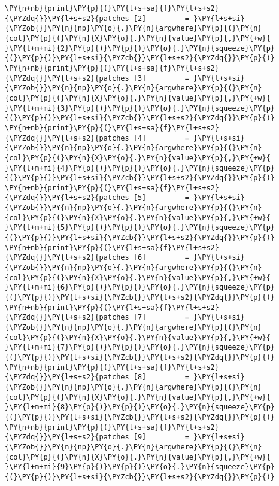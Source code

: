 \begin{tcolorbox}[breakable, size=fbox, boxrule=1pt, pad at break*=1mm,colback=cellbackground, colframe=cellborder]
\begin{Verbatim}[commandchars=\\\{\}]
\PY{n+nb}{print}\PY{p}{(}\PY{l+s+sa}{f}\PY{l+s+s2}{\PYZdq{}}\PY{l+s+s2}{patches [2]         = }\PY{l+s+si}{\PYZob{}}\PY{n}{np}\PY{o}{.}\PY{n}{argwhere}\PY{p}{(}\PY{n}{col}\PY{p}{(}\PY{n}{X}\PY{o}{.}\PY{n}{value}\PY{p}{,}\PY{+w}{ }\PY{l+m+mi}{2}\PY{p}{)}\PY{p}{)}\PY{o}{.}\PY{n}{squeeze}\PY{p}{(}\PY{p}{)}\PY{l+s+si}{\PYZcb{}}\PY{l+s+s2}{\PYZdq{}}\PY{p}{)}
\PY{n+nb}{print}\PY{p}{(}\PY{l+s+sa}{f}\PY{l+s+s2}{\PYZdq{}}\PY{l+s+s2}{patches [3]         = }\PY{l+s+si}{\PYZob{}}\PY{n}{np}\PY{o}{.}\PY{n}{argwhere}\PY{p}{(}\PY{n}{col}\PY{p}{(}\PY{n}{X}\PY{o}{.}\PY{n}{value}\PY{p}{,}\PY{+w}{ }\PY{l+m+mi}{3}\PY{p}{)}\PY{p}{)}\PY{o}{.}\PY{n}{squeeze}\PY{p}{(}\PY{p}{)}\PY{l+s+si}{\PYZcb{}}\PY{l+s+s2}{\PYZdq{}}\PY{p}{)}
\PY{n+nb}{print}\PY{p}{(}\PY{l+s+sa}{f}\PY{l+s+s2}{\PYZdq{}}\PY{l+s+s2}{patches [4]         = }\PY{l+s+si}{\PYZob{}}\PY{n}{np}\PY{o}{.}\PY{n}{argwhere}\PY{p}{(}\PY{n}{col}\PY{p}{(}\PY{n}{X}\PY{o}{.}\PY{n}{value}\PY{p}{,}\PY{+w}{ }\PY{l+m+mi}{4}\PY{p}{)}\PY{p}{)}\PY{o}{.}\PY{n}{squeeze}\PY{p}{(}\PY{p}{)}\PY{l+s+si}{\PYZcb{}}\PY{l+s+s2}{\PYZdq{}}\PY{p}{)}
\PY{n+nb}{print}\PY{p}{(}\PY{l+s+sa}{f}\PY{l+s+s2}{\PYZdq{}}\PY{l+s+s2}{patches [5]         = }\PY{l+s+si}{\PYZob{}}\PY{n}{np}\PY{o}{.}\PY{n}{argwhere}\PY{p}{(}\PY{n}{col}\PY{p}{(}\PY{n}{X}\PY{o}{.}\PY{n}{value}\PY{p}{,}\PY{+w}{ }\PY{l+m+mi}{5}\PY{p}{)}\PY{p}{)}\PY{o}{.}\PY{n}{squeeze}\PY{p}{(}\PY{p}{)}\PY{l+s+si}{\PYZcb{}}\PY{l+s+s2}{\PYZdq{}}\PY{p}{)}
\PY{n+nb}{print}\PY{p}{(}\PY{l+s+sa}{f}\PY{l+s+s2}{\PYZdq{}}\PY{l+s+s2}{patches [6]         = }\PY{l+s+si}{\PYZob{}}\PY{n}{np}\PY{o}{.}\PY{n}{argwhere}\PY{p}{(}\PY{n}{col}\PY{p}{(}\PY{n}{X}\PY{o}{.}\PY{n}{value}\PY{p}{,}\PY{+w}{ }\PY{l+m+mi}{6}\PY{p}{)}\PY{p}{)}\PY{o}{.}\PY{n}{squeeze}\PY{p}{(}\PY{p}{)}\PY{l+s+si}{\PYZcb{}}\PY{l+s+s2}{\PYZdq{}}\PY{p}{)}
\PY{n+nb}{print}\PY{p}{(}\PY{l+s+sa}{f}\PY{l+s+s2}{\PYZdq{}}\PY{l+s+s2}{patches [7]         = }\PY{l+s+si}{\PYZob{}}\PY{n}{np}\PY{o}{.}\PY{n}{argwhere}\PY{p}{(}\PY{n}{col}\PY{p}{(}\PY{n}{X}\PY{o}{.}\PY{n}{value}\PY{p}{,}\PY{+w}{ }\PY{l+m+mi}{7}\PY{p}{)}\PY{p}{)}\PY{o}{.}\PY{n}{squeeze}\PY{p}{(}\PY{p}{)}\PY{l+s+si}{\PYZcb{}}\PY{l+s+s2}{\PYZdq{}}\PY{p}{)}
\PY{n+nb}{print}\PY{p}{(}\PY{l+s+sa}{f}\PY{l+s+s2}{\PYZdq{}}\PY{l+s+s2}{patches [8]         = }\PY{l+s+si}{\PYZob{}}\PY{n}{np}\PY{o}{.}\PY{n}{argwhere}\PY{p}{(}\PY{n}{col}\PY{p}{(}\PY{n}{X}\PY{o}{.}\PY{n}{value}\PY{p}{,}\PY{+w}{ }\PY{l+m+mi}{8}\PY{p}{)}\PY{p}{)}\PY{o}{.}\PY{n}{squeeze}\PY{p}{(}\PY{p}{)}\PY{l+s+si}{\PYZcb{}}\PY{l+s+s2}{\PYZdq{}}\PY{p}{)}
\PY{n+nb}{print}\PY{p}{(}\PY{l+s+sa}{f}\PY{l+s+s2}{\PYZdq{}}\PY{l+s+s2}{patches [9]         = }\PY{l+s+si}{\PYZob{}}\PY{n}{np}\PY{o}{.}\PY{n}{argwhere}\PY{p}{(}\PY{n}{col}\PY{p}{(}\PY{n}{X}\PY{o}{.}\PY{n}{value}\PY{p}{,}\PY{+w}{ }\PY{l+m+mi}{9}\PY{p}{)}\PY{p}{)}\PY{o}{.}\PY{n}{squeeze}\PY{p}{(}\PY{p}{)}\PY{l+s+si}{\PYZcb{}}\PY{l+s+s2}{\PYZdq{}}\PY{p}{)}
    \end{Verbatim}
\end{tcolorbox}
